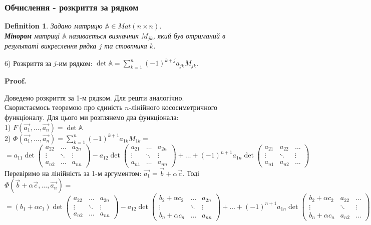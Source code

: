 \documentclass[a4paper, 10pt]{article}
\makeatletter
\theoremstyle{theoremdd}
\newtheorem{definition}[theorem]{Definition}
\renewenvironment{proof}[1][Proof.\\]{\par
\pushQED{\hfill \qed}%
\normalfont \topsep6\p@\@plus6\p@\relax
\trivlist
\item\relax
{\bfseries
#1\@addpunct{.}}\hspace\labelsep\ignorespaces
}{%
\popQED\endtrivlist\@endpefalse
}
\makeatother
\begin{document}
\subsubsection*{Обчислення - розкриття за рядком}
\begin{definition}
Задано матрицю $\mathbb{A} \in Mat(n \times n)$.\\
\textbf{Мінором} матриці $\mathbb{A}$ називається визначник $M_{jk}$, який був отриманий в результаті викреслення рядка $j$ та стовпчика $k$.
\end{definition}

6) Розкриття за $j$-им рядком: $\det \mathbb{A} = \displaystyle \sum_{k=1}^n (-1)^{k+j} a_{jk}M_{jk}$.
\begin{proof}
Доведемо розкриття за 1-м рядком. Для решти аналогічно.\\
Скористаємось теоремою про єдиність $n$-лінійного кососиметричного функціоналу. Для цього ми розглянемо два функціонала:\\
1) $F(\vec{a_1},\dots, \vec{a_n}) = \det \mathbb{A}$\\
2) $\Phi(\vec{a_1},\dots, \vec{a_n}) = \displaystyle \sum_{k=1}^n (-1)^{k+1} a_{1k}M_{1k} =$\\
$= a_{11} \det \begin{pmatrix} a_{22} & \dots & a_{2n} \\ \vdots & \ddots & \vdots \\ a_{n2} & \dots & a_{nn} \end{pmatrix} - a_{12} \det \begin{pmatrix} a_{21} & \dots & a_{2n} \\ \vdots & \ddots & \vdots \\ a_{n1} & \dots & a_{nn} \end{pmatrix} + \dots + (-1)^{n+1} a_{1n} \det \begin{pmatrix} a_{21} & a_{22} & \dots \\ \vdots & \ddots & \vdots \\ a_{n1} & a_{n2} & \dots \end{pmatrix}$\\
Перевіримо на лінійність за 1-м аргументом: $\vec{a_1} = \vec{b} + \alpha \vec{c}$. Тоді\\
$\Phi(\vec{b}+\alpha \vec{c},\dots,\vec{a_n}) =$ \\
$= (b_1 + \alpha c_1) \det \begin{pmatrix} a_{22} & \dots & a_{2n} \\ \vdots & \ddots & \vdots \\ a_{n2} & \dots & a_{nn} \end{pmatrix} - a_{12} \det \begin{pmatrix} b_2 + \alpha c_2 & \dots & a_{2n} \\ \vdots & \ddots & \vdots \\ b_n + \alpha c_n & \dots & a_{nn} \end{pmatrix} + \dots + (-1)^{n+1} a_{1n} \det \begin{pmatrix} b_2 + \alpha c_2 & a_{22} & \dots \\ \vdots & \ddots & \vdots \\ b_n + \alpha c_n & a_{n2} & \dots \end{pmatrix} = $\\

\end{proof}
\end{document}

